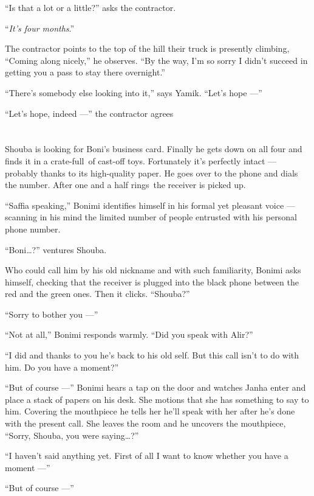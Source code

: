 \documentclass[twoside,11pt]{book}
\begin{document}
``Is that a lot or a little?'' asks the contractor.

``\textit{It's four months}.''

The contractor points to the top of the hill their truck is presently climbing, ``Coming along nicely,'' he
observes. ``By the way, I'm so sorry I didn't succeed in getting you a pass to stay there overnight.''

``There's somebody else looking into it,'' says Yamik. ``Let's hope ---''

``Let's hope, indeed ---'' the contractor agrees


\chapter{}

Shouba is looking for Boni's business card. Finally he gets down on all four and finds it in a crate-full~of cast-off
toys. Fortunately it's perfectly intact ---  probably thanks to its high-quality paper. He goes over to the phone and
dials the number. After one and a half rings~the receiver is picked up.

``Saffia speaking,'' Bonimi identifies himself in his formal yet pleasant voice --- scanning in
his mind the limited number of people entrusted with his personal phone number.

``Boni{\ldots}?'' ventures Shouba.

Who could call him by his old nickname and with such familiarity, Bonimi asks himself, checking that the receiver is
plugged into the black phone between the red and the green ones. Then it clicks. ``Shouba?''

``Sorry to bother you ---''

``Not at all,'' Bonimi responds warmly. ``Did you speak with Alir?''

``I did and thanks to you he's back to his old self. But this call isn't to do with him. Do you have a
moment?''

``But of course ---'' Bonimi hears a tap on the door and watches Janha enter and place a stack
of papers on his desk. She motions that she has something to say to him. Covering the mouthpiece he tells her he'll
speak with her after he's done with the present call. She leaves the room and he uncovers the mouthpiece,
``Sorry, Shouba, you were saying{\ldots}?''

``I haven't said anything yet. First of all I want to know whether you have a moment ---''

``But of course ---''
\end{document}

